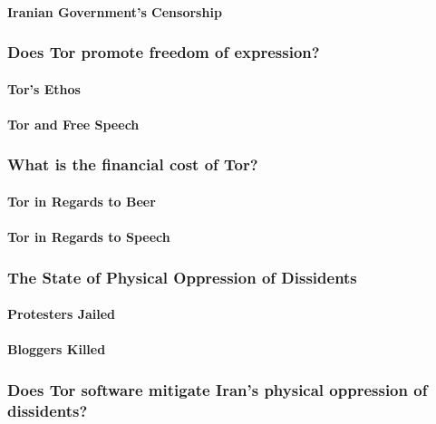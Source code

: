 \documentclass[11pt]{article}
\begin{document}
\begin{multicols}{2}
\paragraph{Iranian Government's Censorship}

\subsubsection{Does Tor promote freedom of expression?}

\paragraph{Tor's Ethos}

\paragraph{Tor and Free Speech}

\subsubsection{What is the financial cost of Tor?}

\paragraph{Tor in Regards to Beer}

\paragraph{Tor in Regards to Speech}

\subsubsection{The State of Physical Oppression of Dissidents}

\paragraph{Protesters Jailed}

\paragraph{Bloggers Killed}

\subsubsection{Does Tor software mitigate Iran's physical oppression of
dissidents?}


\end{multicols}
\end{document}
